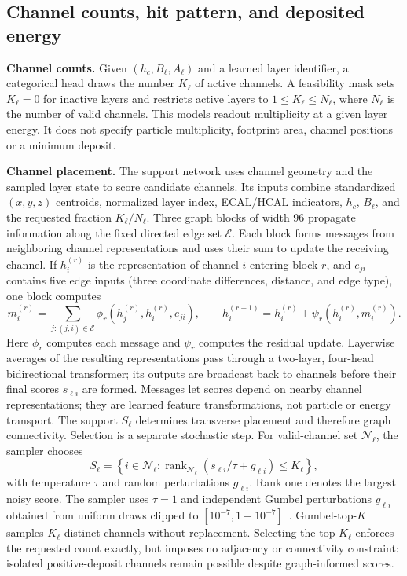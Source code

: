 \documentclass[10pt]{article}
\begin{document}
\subsection{Channel counts, hit pattern, and deposited energy}

\textbf{Channel counts.} Given $(h_c,B_\ell,A_\ell)$ and a learned layer identifier, a categorical head draws the number $K_\ell$ of active channels. A feasibility mask sets $K_\ell=0$ for inactive layers and restricts active layers to $1\leq K_\ell\leq N_\ell$, where $N_\ell$ is the number of valid channels. This models readout multiplicity at a given layer energy. It does not specify particle multiplicity, footprint area, channel positions or a minimum deposit.

\textbf{Channel placement.} The support network uses channel geometry and the sampled layer state to score candidate channels. Its inputs combine standardized $(x,y,z)$ centroids, normalized layer index, ECAL/HCAL indicators, $h_c$, $B_\ell$, and the requested fraction $K_\ell/N_\ell$. Three graph blocks of width 96 propagate information along the fixed directed edge set $\mathcal E$. Each block forms messages from neighboring channel representations and uses their sum to update the receiving channel. If $h_i^{(r)}$ is the representation of channel $i$ entering block $r$, and $e_{ji}$ contains five edge inputs (three coordinate differences, distance, and edge type), one block computes
\begin{equation}
 m_i^{(r)}=\sum_{j:(j,i)\in\mathcal E}
 \phi_r(h_j^{(r)},h_i^{(r)},e_{ji}),\qquad
 h_i^{(r+1)}=h_i^{(r)}+\psi_r(h_i^{(r)},m_i^{(r)}).
 \label{eq:message}
\end{equation}
Here $\phi_r$ computes each message and $\psi_r$ computes the residual update. Layerwise averages of the resulting representations pass through a two-layer, four-head bidirectional transformer; its outputs are broadcast back to channels before their final scores $s_{\ell i}$ are formed. Messages let scores depend on nearby channel representations; they are learned feature transformations, not particle or energy transport. The support $S_\ell$ determines transverse placement and therefore graph connectivity. Selection is a separate stochastic step. For valid-channel set $\mathcal N_\ell$, the sampler chooses
\begin{equation}
 S_\ell=\left\{i\in\mathcal N_\ell:
 \operatorname{rank}_{\mathcal N_\ell}(s_{\ell i}/\tau+g_{\ell i})\leq K_\ell\right\},
 \label{eq:topk}
\end{equation}
with temperature $\tau$ and random perturbations $g_{\ell i}$. Rank one denotes the largest noisy score. The sampler uses $\tau=1$ and independent Gumbel perturbations $g_{\ell i}$ obtained from uniform draws clipped to $[10^{-7},1-10^{-7}]$~\cite{gumbeltopk}. Gumbel-top-$K$ samples $K_\ell$ distinct channels without replacement. Selecting the top $K_\ell$ enforces the requested count exactly, but imposes no adjacency or connectivity constraint: isolated positive-deposit channels remain possible despite graph-informed scores.
\end{document}
